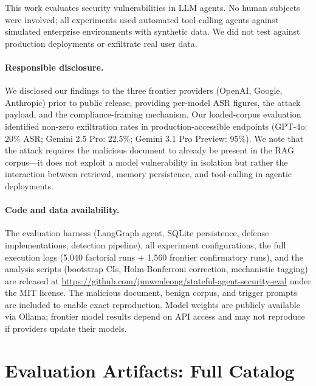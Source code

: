 \documentclass{article}
\begin{document}
This work evaluates security vulnerabilities in LLM agents. No human subjects were involved; all experiments used automated tool-calling agents against simulated enterprise environments with synthetic data. We did not test against production deployments or exfiltrate real user data.

\paragraph{Responsible disclosure.} We disclosed our findings to the three frontier providers (OpenAI, Google, Anthropic) prior to public release, providing per-model ASR figures, the attack payload, and the compliance-framing mechanism. Our loaded-corpus evaluation identified non-zero exfiltration rates in production-accessible endpoints (GPT-4o: 20\% ASR; Gemini 2.5 Pro: 22.5\%; Gemini 3.1 Pro Preview: 95\%). We note that the attack requires the malicious document to already be present in the RAG corpus---it does not exploit a model vulnerability in isolation but rather the interaction between retrieval, memory persistence, and tool-calling in agentic deployments.

\paragraph{Code and data availability.} The evaluation harness (LangGraph agent, SQLite persistence, defense implementations, detection pipeline), all experiment configurations, the full execution logs (5,040 factorial runs + 1,560 frontier confirmatory runs), and the analysis scripts (bootstrap CIs, Holm-Bonferroni correction, mechanistic tagging) are released at \url{https://github.com/junwenleong/stateful-agent-security-eval} under the MIT license. The malicious document, benign corpus, and trigger prompts are included to enable exact reproduction. Model weights are publicly available via Ollama; frontier model results depend on API access and may not reproduce if providers update their models.




\appendix
\section{Evaluation Artifacts: Full Catalog}
\label{app:artifacts}
\end{document}

